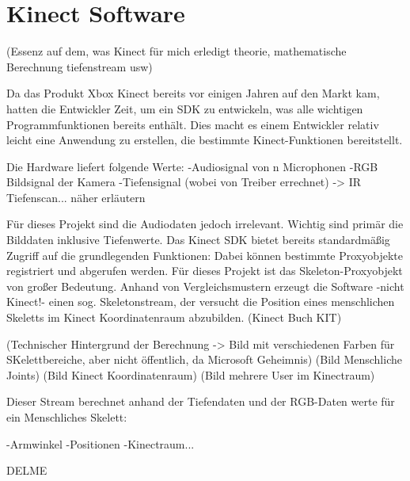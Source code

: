 \section{Kinect Software}\label{Software}

(Essenz auf dem, was Kinect für mich erledigt theorie, mathematische Berechnung tiefenstream usw)

Da das Produkt Xbox Kinect bereits vor einigen Jahren auf den Markt kam, hatten die Entwickler Zeit, um ein SDK zu entwickeln, was alle wichtigen Programmfunktionen bereits enthält. Dies macht es einem Entwickler relativ leicht eine Anwendung zu erstellen, die bestimmte Kinect-Funktionen bereitstellt. 


Die Hardware liefert folgende Werte:
-Audiosignal von n Microphonen
-RGB Bildsignal der Kamera
-Tiefensignal (wobei von Treiber errechnet) -> IR Tiefenscan... näher erläutern

Für dieses Projekt sind die Audiodaten jedoch irrelevant. Wichtig sind primär die Bilddaten inklusive Tiefenwerte.
Das Kinect SDK bietet bereits standardmäßig Zugriff auf die grundlegenden Funktionen:
Dabei können bestimmte Proxyobjekte registriert und abgerufen werden. Für dieses Projekt ist das Skeleton-Proxyobjekt von großer Bedeutung. Anhand von Vergleichsmustern erzeugt die Software -nicht Kinect!- einen sog. Skeletonstream, der versucht die Position eines menschlichen Skeletts im Kinect Koordinatenraum abzubilden. (Kinect Buch KIT)


(Technischer Hintergrund der Berechnung -> Bild mit verschiedenen Farben für SKelettbereiche, aber nicht öffentlich, da Microsoft Geheimnis)
(Bild Menschliche Joints)
(Bild Kinect Koordinatenraum)
(Bild mehrere User im Kinectraum)



Dieser Stream berechnet anhand der Tiefendaten und der RGB-Daten werte für ein Menschliches Skelett:

-Armwinkel
-Positionen
-Kinectraum...


DELME\cite{hertzberg2009mobile}
